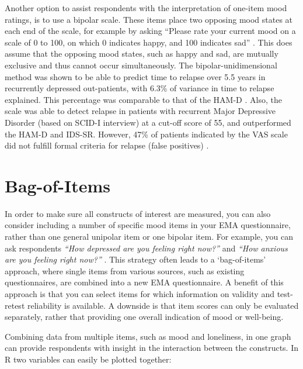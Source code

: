 \documentclass[]{book}
\begin{document}
Another option to assist respondents with the interpretation of one-item
mood ratings, is to use a bipolar scale. These items place two opposing
mood states at each end of the scale, for example by asking ``Please
rate your current mood on a scale of 0 to 100, on which 0 indicates
happy, and 100 indicates sad'' \citep{Vanrijsbergen2014}. This does
assume that the opposing mood states, such as happy and sad, are
mutually exclusive and thus cannot occur simultaneously. The
bipolar-unidimensional method was shown to be able to predict time to
relapse over 5.5 years in recurrently depressed out-patients, with 6.3\%
of variance in time to relapse explained. This percentage was comparable
to that of the HAM-D \citep{Rijsbergen2012}. Also, the scale was able to
detect relapse in patients with recurrent Major Depressive Disorder
(based on SCID-I interview) at a cut-off score of 55, and outperformed
the HAM-D and IDS-SR. However, 47\% of patients indicated by the VAS
scale did not fulfill formal criteria for relapse (false positives)
\citep{Vanrijsbergen2014}.

\section{Bag-of-Items}\label{bag-of-items}


In order to make sure all constructs of interest are measured, you can
also consider including a number of specific mood items in your EMA
questionnaire, rather than one general unipolar item or one bipolar
item. For example, you can ask respondents \emph{``How depressed are you
feeling right now?''} and \emph{``How anxious are you feeling right
now?''} \citep{Starr2012}. This strategy often leads to a `bag-of-items'
approach, where single items from various sources, such as existing
questionnaires, are combined into a new EMA questionnaire. A benefit of
this approach is that you can select items for which information on
validity and test-retest reliability is available. A downside is that
item scores can only be evaluated separately, rather that providing one
overall indication of mood or well-being.

Combining data from multiple items, such as mood and loneliness, in one
graph can provide respondents with insight in the interaction between
the constructs. In R two variables can easily be plotted together:
\end{document}
